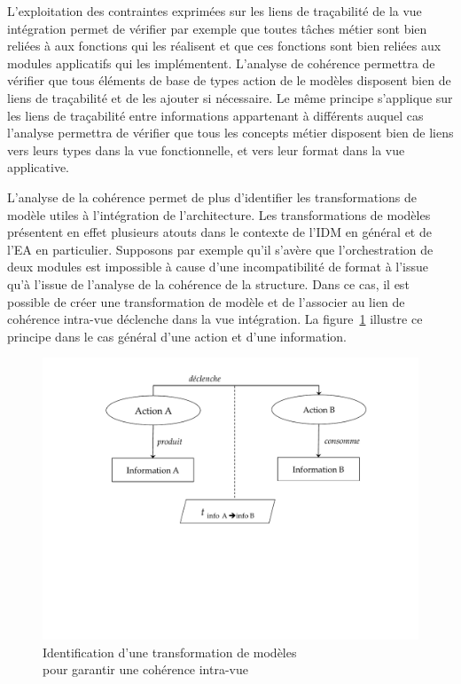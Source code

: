 L'exploitation des contraintes exprimées sur
les liens de traçabilité de la vue intégration  permet de vérifier par exemple 
que toutes tâches métier sont bien reliées à aux fonctions
qui les réalisent et que ces fonctions sont bien reliées aux modules applicatifs qui les implémentent.
L'analyse de cohérence permettra de vérifier que tous éléments de base de types action de le modèles
disposent bien de liens de traçabilité et de les ajouter si nécessaire. Le même principe s'applique sur les
liens de traçabilité entre informations appartenant à différents auquel cas l'analyse permettra de vérifier que tous
les concepts métier disposent bien de liens vers leurs types dans la vue fonctionnelle, et vers leur format
dans la vue applicative.

L'analyse de la cohérence permet de plus d'identifier les transformations de modèle utiles à l'intégration de l'architecture.
Les transformations de modèles présentent en effet plusieurs atouts dans le contexte de l'IDM en général
et de l'EA en particulier. Supposons par exemple qu'il s'avère que
l'orchestration de deux modules est impossible à cause d'une incompatibilité de format
à l'issue qu'à l'issue de l'analyse de la cohérence de la structure. Dans ce cas, il est possible de créer une transformation
de modèle et de l'associer au lien de cohérence intra-vue déclenche dans la vue intégration. La figure~\ref{fig:transfo_coherence}
illustre ce principe dans le cas général d'une action et d'une information.

\begin{figure}[!ht]
 \begin{center}
 \includegraphics[trim= 0cm 7.5cm 0cm 0cm, width=1\textwidth]{figures/4_demarche/transfo_coherence.pdf}
 \end{center}
 \caption{Identification d'une transformation de modèles\\pour garantir une cohérence intra-vue}
 \label{fig:transfo_coherence}
\end{figure}

